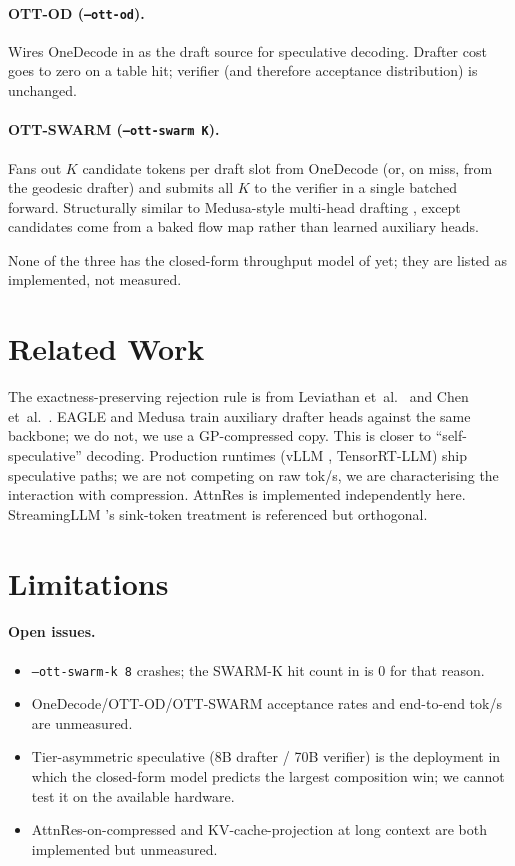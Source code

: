 \documentclass[11pt]{article}
\begin{document}
\paragraph{OTT-OD (\texttt{--ott-od}).}  Wires OneDecode in as the
draft source for speculative decoding.  Drafter cost goes to zero
on a table hit; verifier (and therefore acceptance distribution) is
unchanged.

\paragraph{OTT-SWARM (\texttt{--ott-swarm K}).}  Fans out $K$ candidate
tokens per draft slot from OneDecode (or, on miss, from the geodesic
drafter) and submits all $K$ to the verifier in a single batched forward.
Structurally similar to Medusa-style multi-head drafting
\cite{cai2024medusa}, except candidates come from a baked flow map
rather than learned auxiliary heads.

\noindent
None of the three has the closed-form throughput model of
 yet; they are listed as
implemented, not measured.

\section{Related Work}
The exactness-preserving rejection rule is from Leviathan et~al.\
\cite{leviathan2023speculative} and Chen et~al.\ \cite{chen2023speculative}.
EAGLE \cite{li2024eagle} and Medusa \cite{cai2024medusa} train auxiliary
drafter heads against the same backbone; we do not, we use a
GP-compressed copy.  This is closer to ``self-speculative''
decoding.  Production runtimes (vLLM \cite{kwon2023vllm}, TensorRT-LLM)
ship speculative paths; we are not competing on raw tok/s, we are
characterising the interaction with compression.  AttnRes is implemented
independently here.  StreamingLLM \cite{xiao2023streamingllm}'s sink-token
treatment is referenced but orthogonal.

\section{Limitations}
\label{sec:status}
\paragraph{Open issues.}
\begin{itemize}
\item \texttt{--ott-swarm-k 8} crashes; the SWARM-K hit count in
\Cref{tab:measured} is $0$ for that reason.
\item OneDecode/OTT-OD/OTT-SWARM acceptance rates and end-to-end tok/s
are unmeasured.
\item Tier-asymmetric speculative (8B drafter / 70B verifier) is the
deployment in which the closed-form model predicts the largest
composition win; we cannot test it on the available hardware.
\item AttnRes-on-compressed and KV-cache-projection at long context are
both implemented but unmeasured.
\end{itemize}
\end{document}
